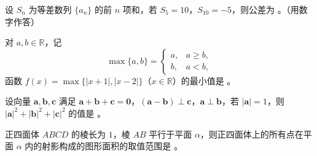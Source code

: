 \begin{question}
设 $S_n$ 为等差数列 $\{a_n\}$ 的前 $n$ 项和，若 $S_5=10$，$S_{10}=-5$，则公差为 \gkblank{}。（用数字作答）

\end{question}
\begin{question}
对 $a,b\in\mathbb R$，记
\nopagebreak[4]
\[
\max\{a,b\}=\begin{cases}
a,&a\geqslant b,\\
b,&a<b,
\end{cases}
\]
函数 $f(x)=\max\{|x+1|,|x-2|\}$（$x\in\mathbb R$）的最小值是 \gkblank{}。

\end{question}
\begin{question}
设向量 $\boldsymbol a,\boldsymbol b,\boldsymbol c$ 满足 $\boldsymbol a+\boldsymbol b+\boldsymbol c=\boldsymbol0$，$(\boldsymbol a-\boldsymbol b)\perp\boldsymbol c$，$\boldsymbol a\perp\boldsymbol b$，若 $|\boldsymbol a|=1$，则 $|\boldsymbol a|^2+|\boldsymbol b|^2+|\boldsymbol c|^2$ 的值是 \gkblank{}。

\Needspace{0.4\textheight}
\end{question}
\begin{question}
正四面体 $ABCD$ 的棱长为 $1$，棱 $AB$ 平行于平面 $\alpha$，则正四面体上的所有点在平面 $\alpha$ 内的射影构成的图形面积的取值范围是 \gkblank{}。
\nopagebreak[4]
\begin{center}\end{center}
\nopagebreak[4]
\end{question}

